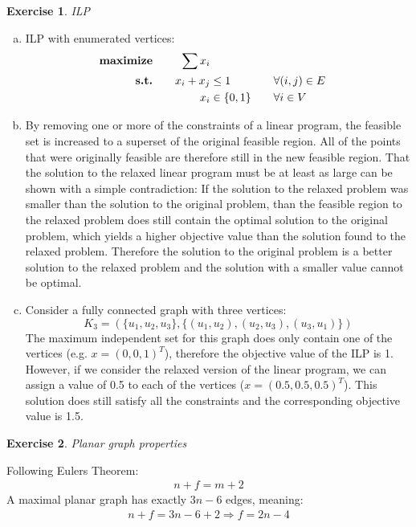 \documentclass[a4paper,12pt,headsepline]{scrartcl}
\newtheorem{aufgabe}{Exercise}
\begin{document}
\begin{aufgabe}ILP
\end{aufgabe}
\begin{enumerate}[a)]
	\item ILP with enumerated vertices:
    \begin{alignat*}{3}
      \textbf{\text{maximize}}\quad && \sum x_i \\
      \textbf{\text{s.t.}}\quad     && x_i + x_j &\leq 1 &&\quad\forall (i,j)\in E\\
                                    && x_i &\in \{0,1\}  &&\quad\forall i \in V
    \end{alignat*}
  \item By removing one or more of the constraints of a linear program, the feasible set is increased to a superset of the original feasible region.
    All of the points that were originally feasible are therefore still in the new feasible region.
    That the solution to the relaxed linear program must be at least as large can be shown with a simple contradiction:
    If the solution to the relaxed problem was smaller than the solution to the original problem, than the feasible region to the relaxed problem does still contain the optimal solution to the original problem, which yields a higher objective value than the solution found to the relaxed problem.
    Therefore the solution to the original problem is a better solution to the relaxed problem and the solution with a smaller value cannot be optimal.
  \item Consider a fully connected graph with three vertices:
    \[ K_3 = (\{u_1,u_2,u_3\},\{(u_1,u_2),(u_2,u_3),(u_3,u_1)\}) \]
    The maximum independent set for this graph does only contain one of the vertices (e.g. $x=(0,0,1)^T$), therefore the objective value of the ILP is 1.
    However, if we consider the relaxed version of the linear program, we can assign a value of 0.5 to each of the vertices ($x=(0.5,0.5,0.5)^T$).
    This solution does still satisfy all the constraints and the corresponding objective value is 1.5.
\end{enumerate}
\newpage
\begin{aufgabe}Planar graph properties
\end{aufgabe}
Following Eulers Theorem:
\begin{align*}
n + f = m + 2
\end{align*}
A maximal planar graph has exactly $3n-6$ edges, meaning:
\begin{align*}
n + f = 3n-6 + 2   \Rightarrow f = 2n-4
\end{align*}
\end{document}
